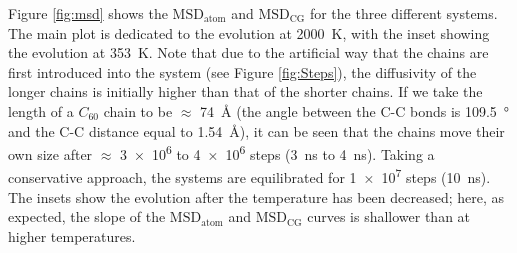 \documentclass[5p]{elsarticle}
\begin{document}
Figure \ref{fig:msd} shows the $\text{MSD}_{\text{atom}}$ and $\text{MSD}_{\text{CG}}$ for the three different systems. The main plot is dedicated to the evolution at \SI{2000}{\kelvin}, with the inset showing the evolution at \SI{353}{\kelvin}. Note that due to the artificial way that the chains are first introduced into the system (see Figure \ref{fig:Steps}), the diffusivity of the longer chains is initially higher than that of the shorter chains.  If we take the length of a $C_{60}$ chain to be $\approx$ \SI{74}{\angstrom} (the angle between the C-C bonds is \SI{109.5}{\degree} and the C-C distance equal to \SI{1.54}{\angstrom}),  it can be seen that the chains move their own size after $\approx$ \SI{3e6}{} to \SI{4e6}{} steps (\SI{3}{\nano\second} to \SI{4}{\nano\second}). Taking a conservative approach, the systems are equilibrated for \SI{1e7}{} steps (\SI{10}{\nano\second}). The insets show the evolution after the temperature has been decreased; here, as expected, the slope of the $\text{MSD}_{\text{atom}}$ and $\text{MSD}_{\text{CG}}$ curves is shallower than at higher temperatures.
\end{document}
